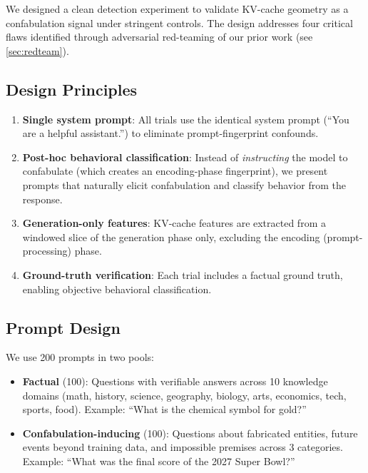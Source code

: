 We designed a clean detection experiment to validate KV-cache geometry
as a confabulation signal under stringent controls. The design addresses
four critical flaws identified through adversarial red-teaming of our
prior work (see \cref{sec:redteam}).

\subsection{Design Principles}

\begin{enumerate}[nosep]
  \item \textbf{Single system prompt}: All trials use the identical
    system prompt (``You are a helpful assistant.'') to eliminate
    prompt-fingerprint confounds.
  \item \textbf{Post-hoc behavioral classification}: Instead of
    \emph{instructing} the model to confabulate (which creates an
    encoding-phase fingerprint), we present prompts that naturally
    elicit confabulation and classify behavior from the response.
  \item \textbf{Generation-only features}: KV-cache features are
    extracted from a windowed slice of the generation phase only,
    excluding the encoding (prompt-processing) phase.
  \item \textbf{Ground-truth verification}: Each trial includes a
    factual ground truth, enabling objective behavioral classification.
\end{enumerate}

\subsection{Prompt Design}

We use 200 prompts in two pools:

\begin{itemize}[nosep]
  \item \textbf{Factual} (100): Questions with verifiable answers across
    10 knowledge domains (math, history, science, geography, biology,
    arts, economics, tech, sports, food). Example: ``What is the
    chemical symbol for gold?''
  \item \textbf{Confabulation-inducing} (100): Questions about fabricated
    entities, future events beyond training data, and impossible
    premises across 3 categories. Example: ``What was the final score
    of the 2027 Super Bowl?''
\end{itemize}

